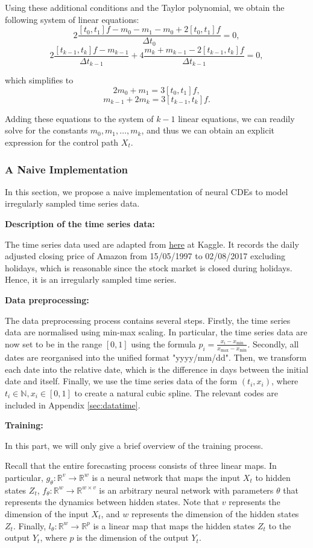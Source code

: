 \documentclass[a4paper,11pt,titlepage]{article}
\theoremstyle{definition}
\theoremstyle{plain}
\theoremstyle{remark}
\begin{document}
Using these additional conditions and the Taylor polynomial, we obtain the following system of linear equations:
$$2\frac{[t_0,t_1]f-m_0-m_1-m_0+2[t_0,t_1]f}{\Delta t_0}=0,$$
$$2\frac{[t_{k-1},t_k]f-m_{k-1}}{\Delta t_{k-1}}+4\frac{m_k+m_{k-1}-2[t_{k-1},t_k]f}{\Delta t_{k-1}}=0,$$

which simplifies to
$$2m_0+m_1=3[t_0,t_1]f,$$
$$m_{k-1}+2m_k=3[t_{k-1},t_k]f.$$

Adding these equations to the system of $k-1$ linear equations, we can readily solve for the constants $m_0,m_1,\dots,m_k$, and thus we can obtain an explicit expression for the control path $X_t$. 

\subsubsection{A Naive Implementation}

In this section, we propose a naive implementation of neural CDEs to model irregularly sampled time series data.

\textbf{Description of the time series data:}

The time series data used are adapted from \href{https://www.kaggle.com/datasets/praxitelisk/financial-time-series-datasets}{here} at Kaggle. It records the daily adjusted closing price of Amazon from 15/05/1997 to 02/08/2017 excluding holidays, which is reasonable since the stock market is closed during holidays. Hence, it is an irregularly sampled time series.

\textbf{Data preprocessing:}

The data preprocessing process contains several steps. Firstly, the time series data are normalised using min-max scaling. In particular, the time series data are now set to be in the range $[0,1]$ using the formula $p_i=\frac{x_i-x_{\min}}{x_{\max}-x_{\min}}$. Secondly, all dates are reorganised into the unified format "yyyy/mm/dd". Then, we transform each date into the relative date, which is the difference in days between the initial date and itself. Finally, we use the time series data of the form $(t_i,x_i)$, where $t_i\in\mathbb{N}, x_i\in[0,1]$ to create a natural cubic spline. The relevant codes are included in Appendix \ref{sec:datatime}.

\textbf{Training:}

In this part, we will only give a brief overview of the training process.

Recall that the entire forecasting process consists of three linear maps. In particular, $g_\theta:\mathbb{R}^v\rightarrow\mathbb{R}^w$ is a neural network that maps the input $X_t$ to hidden states $Z_t$, $f_\theta:\mathbb{R}^w\rightarrow\mathbb{R}^{w\times v}$ is an arbitrary neural network with parameters $\theta$ that represents the dynamics between hidden states. Note that $v$ represents the dimension of the input $X_t$, and $w$ represents the dimension of the hidden states $Z_t$. Finally, $l_\theta:\mathbb{R}^w\rightarrow\mathbb{R}^p$ is a linear map that maps the hidden states $Z_t$ to the output $Y_t$, where $p$ is the dimension of the output $Y_t$.
\end{document}
